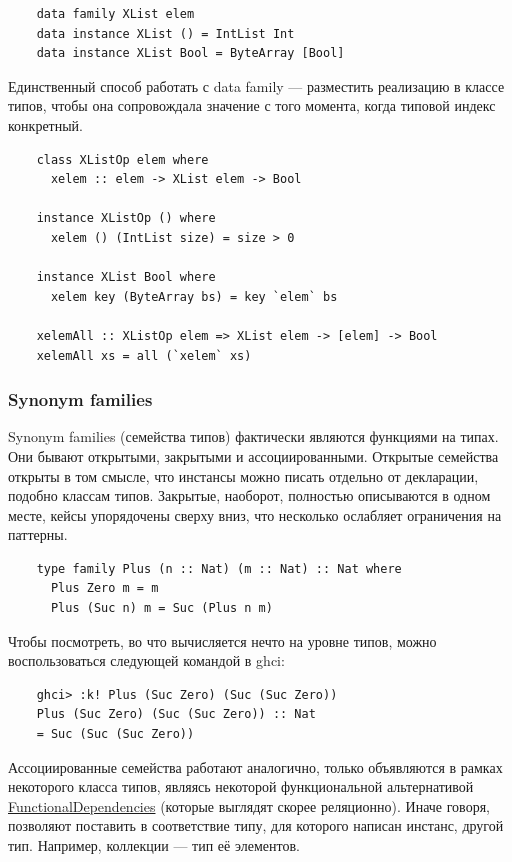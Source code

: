 \begin{verbatim}
    data family XList elem
    data instance XList () = IntList Int
    data instance XList Bool = ByteArray [Bool]
\end{verbatim}

Единственный способ работать с data family --- разместить реализацию в классе типов, чтобы она сопровождала значение с того момента, когда типовой индекс конкретный.

\begin{verbatim}
    class XListOp elem where
      xelem :: elem -> XList elem -> Bool

    instance XListOp () where
      xelem () (IntList size) = size > 0

    instance XList Bool where
      xelem key (ByteArray bs) = key `elem` bs

    xelemAll :: XListOp elem => XList elem -> [elem] -> Bool
    xelemAll xs = all (`xelem` xs)
\end{verbatim}

\subsubsection{Synonym families}

Synonym families (семейства типов) фактически являются функциями на типах.
Они бывают открытыми, закрытыми и ассоциированными.
Открытые семейства открыты в том смысле, что инстансы можно писать отдельно от декларации, подобно классам типов.
Закрытые, наоборот, полностью описываются в одном месте, кейсы упорядочены сверху вниз, что несколько ослабляет ограничения на паттерны.

\begin{verbatim}
    type family Plus (n :: Nat) (m :: Nat) :: Nat where
      Plus Zero m = m
      Plus (Suc n) m = Suc (Plus n m)
\end{verbatim}

Чтобы посмотреть, во что вычисляется нечто на уровне типов, можно воспользоваться следующей командой в ghci:
\begin{verbatim}
    ghci> :k! Plus (Suc Zero) (Suc (Suc Zero))
    Plus (Suc Zero) (Suc (Suc Zero)) :: Nat
    = Suc (Suc (Suc Zero))
\end{verbatim}

Ассоциированные семейства работают аналогично, только объявляются в рамках некоторого класса типов, являясь некоторой функциональной альтернативой \href{https://ghc.gitlab.haskell.org/ghc/doc/users_guide/exts/functional_dependencies.html}{FunctionalDependencies} (которые выглядят скорее реляционно).
Иначе говоря, позволяют поставить в соответствие типу, для которого написан инстанс, другой тип.
Например, коллекции --- тип её элементов.


